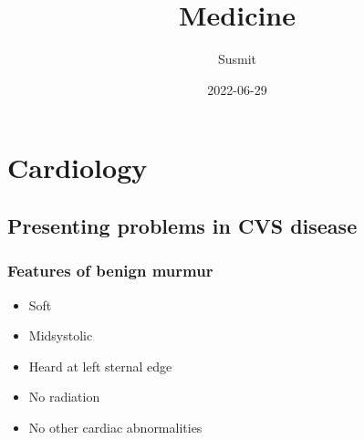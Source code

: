 \documentclass[
  14pt,
]{memoir}
\title{Medicine}
\author{Susmit}
\date{2022-06-29}
\providecommand{\tightlist}{%
  \setlength{\itemsep}{0pt}\setlength{\parskip}{0pt}}
\begin{document}
\frontmatter
\maketitle

\mainmatter
\openany
\raggedbottom
\twocoltocetc
\tableofcontents

\pagebreak

\hypertarget{cardiology}{%
\chapter{Cardiology}\label{cardiology}}

\hypertarget{presenting-problems-in-cvs-disease}{%
\section{Presenting problems in CVS
disease}\label{presenting-problems-in-cvs-disease}}

\hypertarget{features-of-benign-murmur}{%
\subsection{Features of benign murmur}\label{features-of-benign-murmur}}

\begin{itemize}
\tightlist
\item
  Soft
\item
  Midsystolic
\item
  Heard at left sternal edge
\item
  No radiation
\item
  No other cardiac abnormalities
\end{itemize}

\backmatter
\end{document}
